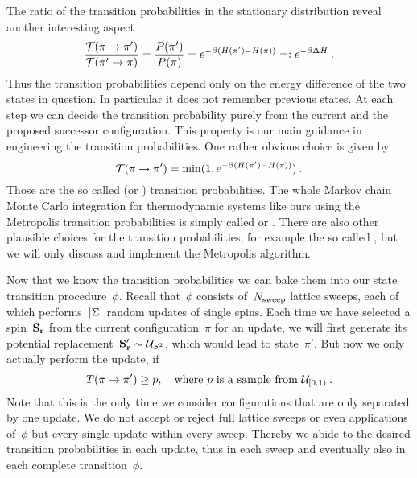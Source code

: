 The ratio of the transition probabilities in the stationary distribution reveal
another interesting aspect
%
\begin{equation}
  \frac{\mathcal{T}(\pi \to \pi')}{\mathcal{T}(\pi' \to \pi)} = \frac{P(\pi')}{P(\pi)} =
  e^{-\beta (H(\pi') - H(\pi))} =: e^{-\beta \Delta H}\:.
\end{equation}
%
Thus the transition probabilities depend only on the energy difference of the
two states in question. In particular it does not remember previous states. At
each step we can decide the transition probability purely from the current and
the proposed successor configuration. This property is our main guidance in
engineering the transition probabilities. One rather obvious choice is given by
%
\begin{equation}
  \mathcal{T}(\pi \to \pi') = \min(1, e^{-\beta (H(\pi') - H(\pi))})\:.
\end{equation}
%
Those are the so called  (or )
transition probabilities. The whole Markov chain Monte Carlo integration for
thermodynamic systems like ours using the Metropolis transition probabilities is
simply called  or . There are also other plausible choices for the transition
probabilities, for example the so called , but we will only discuss and implement the
Metropolis algorithm.

Now that we know the transition probabilities we can bake them into our state
transition procedure~$\phi$. Recall that~$\phi$ consists of~$N_{\mathrm{sweep}}$ lattice
sweeps, each of which performs~$\abs{\Sigma}$ random updates of single spins. Each
time we have selected a spin~$\mathbf{S}_{\mathbf{r}}$ from the current configuration~$\pi$ for
an update, we will first generate its potential replacement~$\mathbf{S}'_{\mathbf{r}} \sim
\mathcal{U}_{S^2}$, which would lead to state~$\pi'$. But now we only actually perform
the update, if
%
\begin{equation}
  T(\pi \to \pi') \ge p, \quad \text{where } p
    \text{ is a sample from } \mathcal{U}_{[0,1)}\:.
\end{equation}
%
Note that this is the only time we consider configurations that are only
separated by one update. We do not accept or reject full lattice sweeps or even
applications of~$\phi$ but every single update within every sweep. Thereby we
abide to the desired transition probabilities in each update, thus in each sweep
and eventually also in each complete transition~$\phi$.

